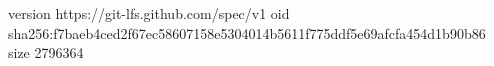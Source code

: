 version https://git-lfs.github.com/spec/v1
oid sha256:f7baeb4ced2f67ec58607158e5304014b5611f775ddf5e69afcfa454d1b90b86
size 2796364
